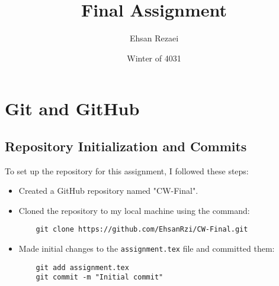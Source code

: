 \documentclass{article}
\title{Final Assignment}
\author{Ehsan Rezaei}
\date{Winter of 4031}
\begin{document}
  
\maketitle  
\tableofcontents  
\newpage
\section{Git and GitHub}  
\subsection{Repository Initialization and Commits}  
To set up the repository for this assignment, I followed these steps:  
\begin{itemize}  
    \item Created a GitHub repository named "CW-Final".  
    \item Cloned the repository to my local machine using the command:  
    \begin{verbatim}  
    git clone https://github.com/EhsanRzi/CW-Final.git  
    \end{verbatim}  
    \item Made initial changes to the \texttt{assignment.tex} file and committed them:  
    \begin{verbatim}  
    git add assignment.tex  
    git commit -m "Initial commit"  
    \end{verbatim}  
\end{itemize}
\end{document}
